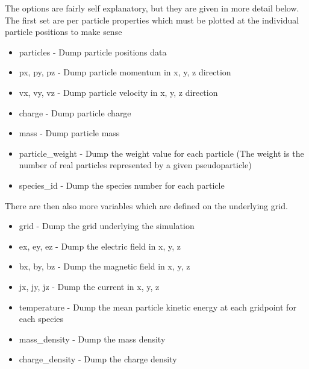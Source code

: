 \documentclass[12pt,a4paper]{article}
\begin{document}
The options are fairly self explanatory, but they are given in more detail
below. The first set are per particle properties which must be plotted at the
individual particle positions to make sense\\
\begin{itemize}
\item particles - Dump particle positions data
\item px, py, pz - Dump particle momentum in x, y, z direction
\item vx, vy, vz - Dump particle velocity in x, y, z direction
\item charge - Dump particle charge
\item mass - Dump particle mass
\item particle\_weight - Dump the weight value for each particle (The weight
  is the number of real particles represented by a given pseudoparticle)
\item species\_id - Dump the species number for each particle
\end{itemize}

There are then also more variables which are defined on the underlying grid.\\
\begin{itemize}
\item grid - Dump the grid underlying the simulation
\item ex, ey, ez - Dump the electric field in x, y, z
\item bx, by, bz - Dump the magnetic field in x, y, z
\item jx, jy, jz - Dump the current in x, y, z
\item temperature - Dump the mean particle kinetic energy at each gridpoint
  for each species
\item mass\_density - Dump the mass density
\item charge\_density - Dump the charge density
\end{itemize}
\end{document}
